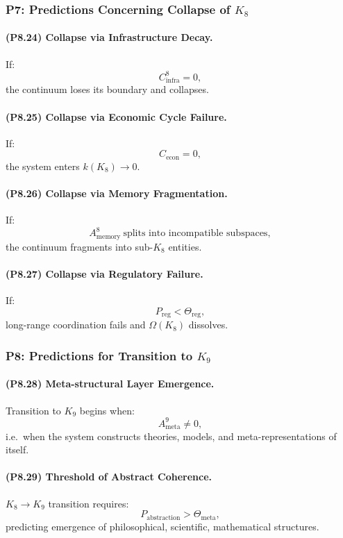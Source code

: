 \subsubsection{P7: Predictions Concerning Collapse of \texorpdfstring{$K_8$}{K_8}}

\paragraph{(P8.24) Collapse via Infrastructure Decay.}
If:
\[
C_{\mathrm{infra}}^8 = 0,
\]
the continuum loses its boundary and collapses.

\paragraph{(P8.25) Collapse via Economic Cycle Failure.}
If:
\[
C_{\mathrm{econ}} = 0,
\]
the system enters $k(K_8) \to 0$.

\paragraph{(P8.26) Collapse via Memory Fragmentation.}
If:
\[
A_{\mathrm{memory}}^8 \ \text{splits into incompatible subspaces},
\]
the continuum fragments into sub-$K_8$ entities.

\paragraph{(P8.27) Collapse via Regulatory Failure.}
If:
\[
P_{\mathrm{reg}} < \Theta_{\mathrm{reg}},
\]
long-range coordination fails and $\Omega(K_8)$ dissolves.

\subsubsection{P8: Predictions for Transition to \texorpdfstring{$K_9$}{K_9}}

\paragraph{(P8.28) Meta-structural Layer Emergence.}
Transition to $K_9$ begins when:
\[
A_{\mathrm{meta}}^9 \neq 0,
\]
i.e.\ when the system constructs theories, models, and meta-representations of itself.

\paragraph{(P8.29) Threshold of Abstract Coherence.}
$K_8 \to K_9$ transition requires:
\[
P_{\mathrm{abstraction}} > \Theta_{\mathrm{meta}},
\]
predicting emergence of philosophical, scientific, mathematical structures.


